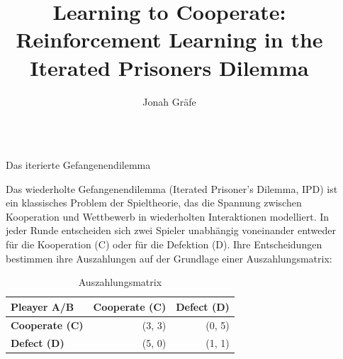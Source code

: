 \documentclass[final]{beamer}
\title{Learning to Cooperate: Reinforcement Learning in the Iterated Prisoners Dilemma}
\author{Jonah Gräfe}
\newlength{\sepwidth}
\newlength{\colwidth}
\newcommand{\separatorcolumn}{\begin{column}{\sepwidth}\end{column}}
\begin{document}



\begin{frame}[t]
\begin{columns}[t]
\separatorcolumn

\begin{column}{\colwidth}

  \begin{block}{Das iterierte Gefangenendilemma}

    Das wiederholte Gefangenendilemma (Iterated Prisoner's Dilemma, IPD) ist ein klassisches Problem der Spieltheorie, 
    das die Spannung zwischen Kooperation und Wettbewerb in wiederholten Interaktionen modelliert. In jeder Runde entscheiden sich 
    zwei Spieler unabhängig voneinander entweder für die Kooperation (C) oder für die Defektion (D). Ihre Entscheidungen bestimmen 
    ihre Auszahlungen auf der Grundlage einer Auszahlungsmatrix:

    \begin{table}
      \centering
      \begin{tabular}{l r r }
        \toprule
        \textbf{Pleayer A/B} & \textbf{Cooperate (C)} & \textbf{Defect (D)}\\
        \midrule
        \textbf{Cooperate (C)} & (3, 3) & (0, 5) \\
        \midrule
        \textbf{Defect (D)} & (5, 0) & (1, 1) \\
        \bottomrule
      \end{tabular}
      \caption{Auszahlungsmatrix}
    \end{table}

  

\end{block}
\end{column}
\end{columns}
\end{frame}
\end{document}
